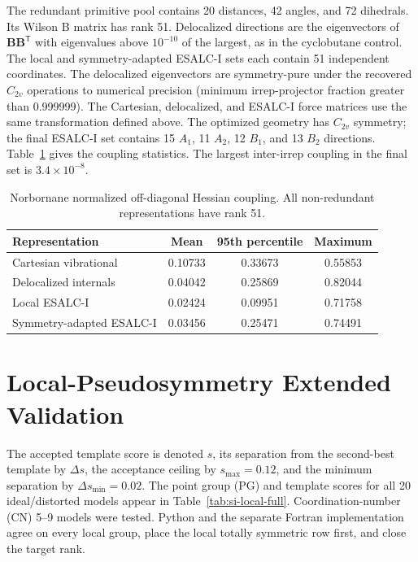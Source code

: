 \documentclass[10pt]{article}
\newcommand{\Bmat}{\mathbf{B}}
\begin{document}
{{The redundant primitive pool contains 20 distances, 42
angles, and 72 dihedrals.  Its Wilson B matrix has rank 51.  Delocalized
directions are the eigenvectors of \(\Bmat\Bmat^{\mathsf T}\) with eigenvalues
above \(10^{-10}\) of the largest, as in the cyclobutane control.  The local
and symmetry-adapted ESALC-I sets each contain 51 independent coordinates.
The delocalized eigenvectors are symmetry-pure under the recovered
\(C_{2v}\) operations to numerical precision (minimum irrep-projector
fraction greater than 0.999999).
The Cartesian, delocalized, and ESALC-I force matrices use the same
transformation defined above.  The optimized geometry has \(C_{2v}\)
symmetry; the final ESALC-I set contains 15 \(A_1\), 11 \(A_2\), 12 \(B_1\), and
13 \(B_2\) directions.  Table~\ref{tab:norbornane-hessian} gives the coupling
statistics.  The largest inter-irrep coupling in the final set is
\(3.4\times10^{-8}\).}

\begin{table}[htbp]
\centering
\caption{Norbornane normalized off-diagonal Hessian coupling.  All
non-redundant representations have rank 51.}
\label{tab:norbornane-hessian}
\begin{tabular}{lccc}
\toprule
Representation & Mean & 95th percentile & Maximum \\
\midrule
Cartesian vibrational & 0.10733 & 0.33673 & 0.55853 \\
Delocalized internals & 0.04042 & 0.25869 & 0.82044 \\
Local ESALC-I & 0.02424 & 0.09951 & 0.71758 \\
Symmetry-adapted ESALC-I & 0.03456 & 0.25471 & 0.74491 \\
\bottomrule
\end{tabular}
\end{table}

\section{Local-Pseudosymmetry Extended Validation}

The accepted template score is denoted \(s\), its separation from the
second-best template by \(\Delta s\), the acceptance ceiling by
\(s_{\max}=0.12\), and the minimum separation by
\(\Delta s_{\min}=0.02\).  {The point group (PG) and template
scores} for all 20 ideal/distorted models appear in Table~\ref{tab:si-local-full}.
{Coordination-number (CN) 5--9 models} were tested.  Python and the separate Fortran implementation agree on every local
group, place the local totally symmetric row first, and close the target rank.

}
\end{document}
